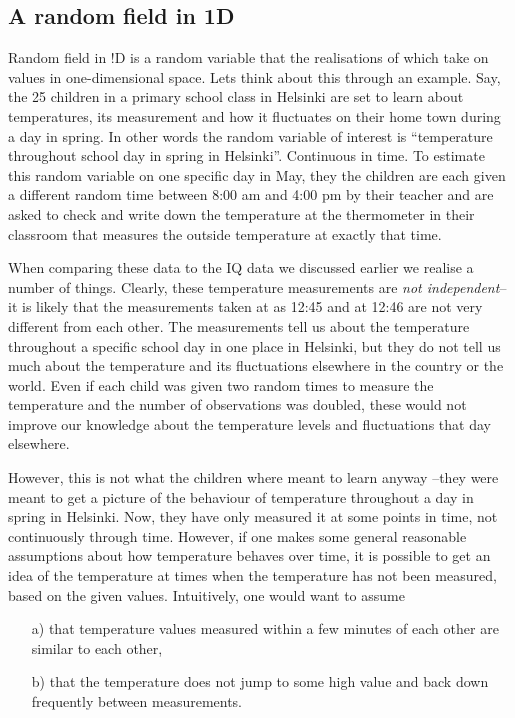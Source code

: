 \subsection{A random field in 1D}
Random field in !D is a random variable that the realisations of which take on values in one-dimensional space. Lets think about this through an example. Say, the 25 children in a primary school class in Helsinki are set to learn about temperatures, its measurement and how it fluctuates on their home town during a day in spring. In other words the random variable of interest is ``temperature throughout school day in spring in Helsinki''. Continuous in time. To estimate this random variable on one specific day in May, they the children are each given a different random time between 8:00 am and 4:00 pm by their teacher and are asked to check and write down the temperature at the thermometer in their classroom that measures the outside temperature at exactly that time. 

When comparing these data to the IQ data we discussed earlier we realise a number of things. Clearly, these temperature measurements are \textit{not independent}--it is likely that the measurements taken at as 12:45 and at 12:46 are not very different from each other. The measurements tell us about the temperature throughout a specific school day in one place in Helsinki, but they do not tell us much about the temperature and its fluctuations elsewhere in the country or the world. Even if each child was given two random times to measure the temperature and the number of observations was doubled, these would not improve our knowledge about the temperature levels and fluctuations that day elsewhere.

However, this is not what the children where meant to learn anyway --they were meant to get a picture of the behaviour of temperature throughout a day in spring in Helsinki.  Now, they have only measured it at some points in time, not continuously through time.
However, if one makes some general reasonable assumptions about how temperature behaves over time, it is possible to get an idea of the temperature at times when the temperature has not been measured, based on the given values. 
Intuitively, one would want to assume 
\begin{itemize}
\item[a)] that temperature values measured within a few minutes of each other are similar to each other,  
\item[b)] that the temperature does not jump to some high value and back down frequently between measurements. 
\end{itemize}

